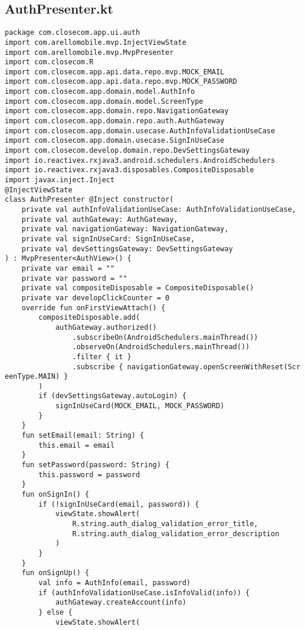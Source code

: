 \documentclass[listing]{espd}
\begin{document}
\subsection{AuthPresenter.kt}
\begin{verbatim}
package com.closecom.app.ui.auth
import com.arellomobile.mvp.InjectViewState
import com.arellomobile.mvp.MvpPresenter
import com.closecom.R
import com.closecom.app.api.data.repo.mvp.MOCK_EMAIL
import com.closecom.app.api.data.repo.mvp.MOCK_PASSWORD
import com.closecom.app.domain.model.AuthInfo
import com.closecom.app.domain.model.ScreenType
import com.closecom.app.domain.repo.NavigationGateway
import com.closecom.app.domain.repo.auth.AuthGateway
import com.closecom.app.domain.usecase.AuthInfoValidationUseCase
import com.closecom.app.domain.usecase.SignInUseCase
import com.closecom.develop.domain.repo.DevSettingsGateway
import io.reactivex.rxjava3.android.schedulers.AndroidSchedulers
import io.reactivex.rxjava3.disposables.CompositeDisposable
import javax.inject.Inject
@InjectViewState
class AuthPresenter @Inject constructor(
    private val authInfoValidationUseCase: AuthInfoValidationUseCase,
    private val authGateway: AuthGateway,
    private val navigationGateway: NavigationGateway,
    private val signInUseCard: SignInUseCase,
    private val devSettingsGateway: DevSettingsGateway
) : MvpPresenter<AuthView>() {
    private var email = ""
    private var password = ""
    private val compositeDisposable = CompositeDisposable()
    private var developClickCounter = 0
    override fun onFirstViewAttach() {
        compositeDisposable.add(
            authGateway.authorized()
                .subscribeOn(AndroidSchedulers.mainThread())
                .observeOn(AndroidSchedulers.mainThread())
                .filter { it }
                .subscribe { navigationGateway.openScreenWithReset(Scr
eenType.MAIN) }
        )
        if (devSettingsGateway.autoLogin) {
            signInUseCard(MOCK_EMAIL, MOCK_PASSWORD)
        }
    }
    fun setEmail(email: String) {
        this.email = email
    }
    fun setPassword(password: String) {
        this.password = password
    }
    fun onSignIn() {
        if (!signInUseCard(email, password)) {
            viewState.showAlert(
                R.string.auth_dialog_validation_error_title,
                R.string.auth_dialog_validation_error_description
            )
        }
    }
    fun onSignUp() {
        val info = AuthInfo(email, password)
        if (authInfoValidationUseCase.isInfoValid(info)) {
            authGateway.createAccount(info)
        } else {
            viewState.showAlert(

\end{verbatim}
\end{document}

